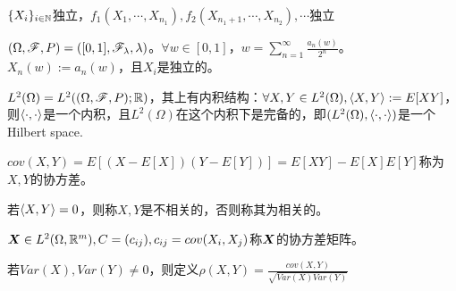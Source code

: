 \documentclass{ctexart}
\begin{document}
\begin{Eg}
  $\{X_{i}\}_{i\in\mathbb{N}}$独立，$f_{1}(X_{1},\cdots,X_{n_{1}}),f_{2}(X_{n_{1}+1},\cdots, X_{n_{2}}),\cdots$独立
\end{Eg}

\begin{Eg}[由乘积空间构造独立性]
  $(\Omega,\mathscr{F},P)=([0,1],\mathscr{F}_{\lambda},\lambda)$。$\forall w\in [0,1]$，$w=\sum_{n=1}^{\infty}\frac{a_{n}(w)}{2^{n}}$。$X_{n}(w):=a_{n}(w)$，且$X_{i}$是独立的。
\end{Eg}

$L^{2}(\Omega)=L^{2}((\Omega,\mathscr{F},P);\mathbb{R})$，其上有内积结构：$\forall X,Y\in L^{2}(\Omega),\left<X,Y\right>:=E[XY]$，则$\left<\cdot,\cdot\right>$是一个内积，且$L^{2}(\Omega)$在这个内积下是完备的，即$(L^{2}(\Omega),\left<\cdot,\cdot\right>)$是一个Hilbert space.

\begin{Def}
  $cov(X,Y)=E[(X-E[X])(Y-E[Y])]=E[XY]-E[X]E[Y]$称为$X,Y$的协方差。

  若$\left<X,Y\right>=0$，则称$X,Y$是不相关的，否则称其为相关的。

$\bm{X}\in L^{2}(\Omega,\mathbb{R}^{m}),C=(c_{ij}),c_{ij}=cov(X_{i},X_{j})$称$\bm{X}$的协方差矩阵。

若$Var(X),Var(Y)\neq 0$，则定义$\rho(X,Y)=\frac{cov(X,Y)}{\sqrt{Var(X)Var(Y)}}$
\end{Def}

\begin{comment}
\begin{Eg}
  $\{X_{i}\}_{i=1}^{n}$是独立的随机变量，$S_{n}=\sum_{i=1}^{n}X_{i}$，求$Var(S_{n})$
\end{Eg}
\end{comment}
\end{document}
